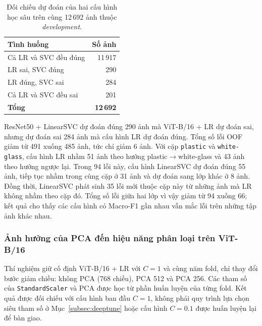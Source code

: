 \begin{table}[H]\centering\caption{Đối chiếu dự đoán của hai cấu hình học sâu trên cùng 12\,692 ảnh thuộc \textit{development}.}\label{tab:paired}
\small\begin{tabular}{@{}lr@{}}\toprule
Tình huống & Số ảnh\\\midrule
Cả LR và SVC đều đúng & 11\,917\\
LR sai, SVC đúng & 290\\
LR đúng, SVC sai & 284\\
Cả LR và SVC đều sai & 201\\\midrule
\textbf{Tổng} & \textbf{12\,692}\\\bottomrule
\end{tabular}\end{table}

ResNet50 + LinearSVC dự đoán đúng 290 ảnh mà ViT-B/16 + LR dự đoán sai, nhưng dự đoán sai 284 ảnh mà cấu hình LR dự đoán đúng. Tổng số lỗi OOF giảm từ 491 xuống 485 ảnh, tức chỉ giảm 6 ảnh. Với cặp \texttt{plastic} và \texttt{white-glass}, cấu hình LR nhầm 51 ảnh theo hướng plastic$\to$white-glass và 43 ảnh theo hướng ngược lại. Trong 94 lỗi này, cấu hình LinearSVC dự đoán đúng 55 ảnh, tiếp tục nhầm trong cùng cặp ở 31 ảnh và dự đoán sang lớp khác ở 8 ảnh. Đồng thời, LinearSVC phát sinh 35 lỗi mới thuộc cặp này từ những ảnh mà LR không nhầm theo cặp đó. Tổng số lỗi giữa hai lớp vì vậy giảm từ 94 xuống 66; kết quả cho thấy các cấu hình có Macro-F1 gần nhau vẫn mắc lỗi trên những tập ảnh khác nhau.

\subsubsection{Ảnh hưởng của PCA đến hiệu năng phân loại trên ViT-B/16}
\label{subsec:deeppca}
Thí nghiệm giữ cố định ViT-B/16 + LR với $C=1$ và cùng năm fold, chỉ thay đổi bước giảm chiều: không PCA (768 chiều), PCA 512 và PCA 256. Các tham số của \texttt{StandardScaler} và PCA được học từ phần huấn luyện của từng fold. Kết quả được đối chiếu với cấu hình ban đầu $C=1$, không phải quy trình lựa chọn siêu tham số ở Mục~\ref{subsec:deeptune} hoặc cấu hình $C=0.1$ được huấn luyện lại để bàn giao.

